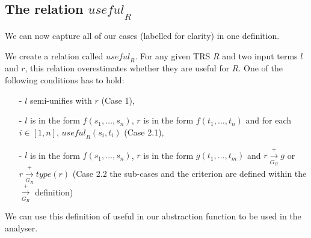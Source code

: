 \subsection*{The relation $\textit{useful}_R$}
We can now capture all of our cases (labelled for clarity) in one definition. 
\begin{definition}
\label{def:useful}
We create a relation called $\textit{useful}_R$. For any given TRS $R$ and two input terms $l$ and $r$, this relation overestimates whether they are useful for $R$. One of the following conditions has to hold:
\begin{itemize}
    \itemsep -.1em
    \item[-] $l$ semi-unifies with $r$ (Case 1),
    \item[-] $l$ is in the form $f(s_1, \dots, s_n)$, $r$ is in the form $f(t_1, \dots, t_n)$ and for each $i \in [1, n]$, $\textit{useful}_R(s_i, t_i)$ (Case 2.1),
    \item[-] $l$ is in the form $f(s_1, \dots, s_n)$, $r$ is in the form $g(t_1, \dots, t_m)$ and $r \xrightarrow[G_R]{+} g$ or $r \xrightarrow[G_R]{+} \textit{type}(r)$ (Case 2.2 the sub-cases and the criterion are defined within the $\xrightarrow[G_R]{+}$ definition)
\end{itemize}
\end{definition}

We can use this definition of useful in our abstraction function to be used in the analyser. 

